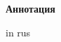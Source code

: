\newpage
\pagestyle{plain}

{
\begin{center}
    \Large
    \textbf{Аннотация}
\end{center}
in rus
}